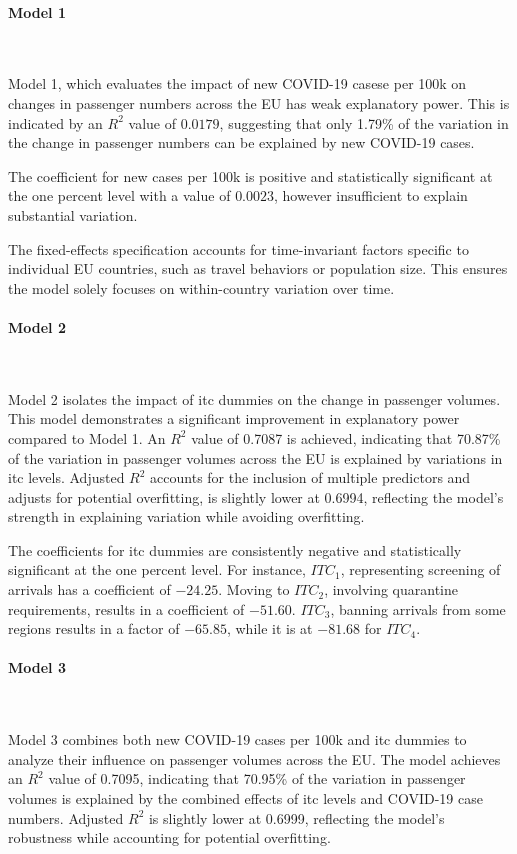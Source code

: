 \documentclass[12pt,onehalfspacing,headsepline,oneside,openright,a4paper, fleqn]{report}
\begin{document}
\paragraph{Model 1}
\

Model 1, which evaluates the impact of new COVID-19 casese per 100k on changes in passenger numbers across the EU has weak explanatory power. This is indicated by an $R^2$ value of $0.0179$, suggesting that only 1.79\% of the variation in the change in passenger numbers can be explained by new COVID-19 cases.

The coefficient for new cases per 100k is positive and statistically significant at the one percent level with a value of $0.0023$, however insufficient to explain substantial variation. 

The fixed-effects specification accounts for time-invariant factors specific to individual EU countries, such as travel behaviors or population size. This ensures the model solely focuses on within-country variation over time.

\paragraph{Model 2}
\

Model 2 isolates the impact of \gls{itc} dummies on the change in passenger volumes. This model demonstrates a significant improvement in explanatory power compared to Model 1. An $R^2$ value of 0.7087 is achieved, indicating that 70.87\% of the variation in passenger volumes across the EU is explained by variations in \gls{itc} levels. Adjusted $R^2$ accounts for the inclusion of multiple predictors and adjusts for potential overfitting, is slightly lower at 0.6994, reflecting the model's strength in explaining variation while avoiding overfitting.

The coefficients for \gls{itc} dummies are consistently negative and statistically significant at the one percent level. For instance, $ITC_1$, representing screening of arrivals has a coefficient of $-24.25$. Moving to $ITC_2$, involving quarantine requirements, results in a coefficient of $-51.60$. $ITC_3$, banning arrivals from some regions results in a factor of $-65.85$, while it is at $-81.68$ for $ITC_4$.

\paragraph{Model 3}
\

Model 3 combines both new COVID-19 cases per 100k and \gls{itc} dummies to analyze their influence on passenger volumes across the EU. The model achieves an $R^2$ value of 0.7095, indicating that 70.95\% of the variation in passenger volumes is explained by the combined effects of \gls{itc} levels and COVID-19 case numbers. Adjusted $R^2$ is slightly lower at 0.6999, reflecting the model's robustness while accounting for potential overfitting. 
\end{document}
